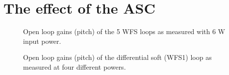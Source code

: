 \section{The effect of the ASC}


\begin{figure}
\begin{centering}
\caption{Open loop gains (pitch) of the 5 WFS loops as measured with 6 W
  input power.}
\label{fig:olgs6W}
\end{centering}
\end{figure}


\begin{figure}
\begin{centering}
\caption{Open loop gains (pitch) of the differential soft (WFS1) loop as measured at four
  different powers.}
\label{fig:DSolgs}
\end{centering}
\end{figure}

